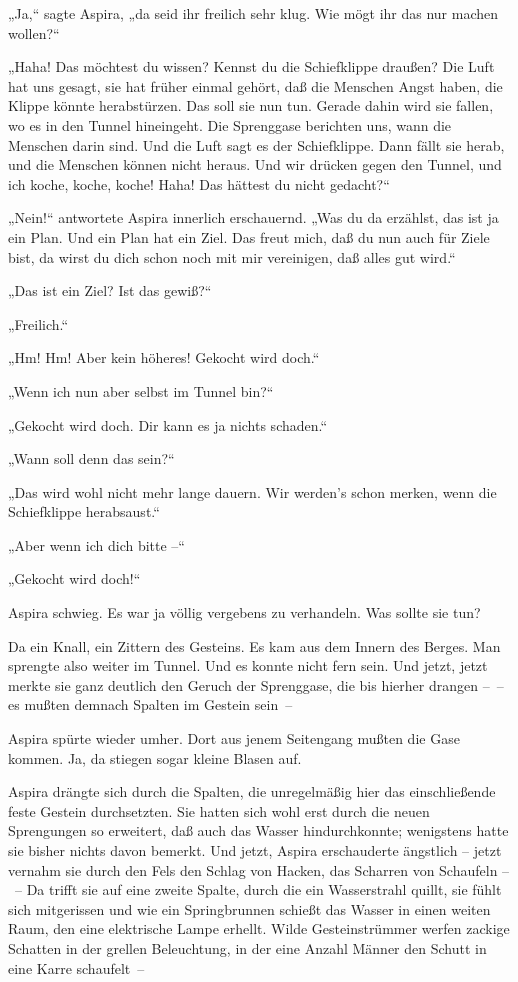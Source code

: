 „Ja,“ sagte Aspira, „da seid ihr freilich sehr klug. Wie mögt ihr
das nur machen wollen?“

„Haha! Das möchtest du wissen? Kennst du die Schiefklippe draußen?
Die Luft hat uns gesagt, sie hat früher einmal gehört, daß die
Menschen Angst haben, die Klippe könnte herabstürzen. Das soll sie
nun tun. Gerade dahin wird sie fallen, wo es in den Tunnel
hineingeht. Die Sprenggase berichten uns, wann die Menschen darin
sind. Und die Luft sagt es der Schiefklippe. Dann fällt sie herab,
und die Menschen können nicht heraus. Und wir drücken gegen den
Tunnel, und ich koche, koche, koche! Haha! Das hättest du nicht
gedacht?“

„Nein!“ antwortete Aspira innerlich erschauernd. „Was du da
erzählst, das ist ja ein Plan. Und ein Plan hat ein Ziel. Das freut
mich, daß du nun auch für Ziele bist, da wirst du dich schon noch
mit mir vereinigen, daß alles gut wird.“

„Das ist ein Ziel? Ist das gewiß?“

„Freilich.“

„Hm! Hm! Aber kein höheres! Gekocht wird doch.“

„Wenn ich nun aber selbst im Tunnel bin?“

„Gekocht wird doch. Dir kann es ja nichts schaden.“

„Wann soll denn das sein?“

„Das wird wohl nicht mehr lange dauern. Wir werden's schon merken,
wenn die Schiefklippe herabsaust.“

„Aber wenn ich dich bitte –“

„Gekocht wird doch!“

Aspira schwieg. Es war ja völlig vergebens zu verhandeln. Was
sollte sie tun?

Da ein Knall, ein Zittern des Gesteins. Es kam aus dem Innern des
Berges. Man sprengte also weiter im Tunnel. Und es konnte nicht
fern sein. Und jetzt, jetzt merkte sie ganz deutlich den Geruch der
Sprenggase, die bis hierher drangen –~– es mußten demnach Spalten
im Gestein sein~–

Aspira spürte wieder umher. Dort aus jenem Seitengang mußten die
Gase kommen. Ja, da stiegen sogar kleine Blasen auf.

Aspira drängte sich durch die Spalten, die unregelmäßig hier das
einschließende feste Gestein durchsetzten. Sie hatten sich wohl
erst durch die neuen Sprengungen so erweitert, daß auch das Wasser
hindurchkonnte; wenigstens hatte sie bisher nichts davon bemerkt.
Und jetzt, Aspira erschauderte ängstlich – jetzt vernahm sie durch
den Fels den Schlag von Hacken, das Scharren von Schaufeln –~– Da
trifft sie auf eine zweite Spalte, durch die ein Wasserstrahl
quillt, sie fühlt sich mitgerissen und wie ein Springbrunnen
schießt das Wasser in einen weiten Raum, den eine elektrische Lampe
erhellt. Wilde Gesteinstrümmer werfen zackige Schatten in der
grellen Beleuchtung, in der eine Anzahl Männer den Schutt in eine
Karre schaufelt~–

